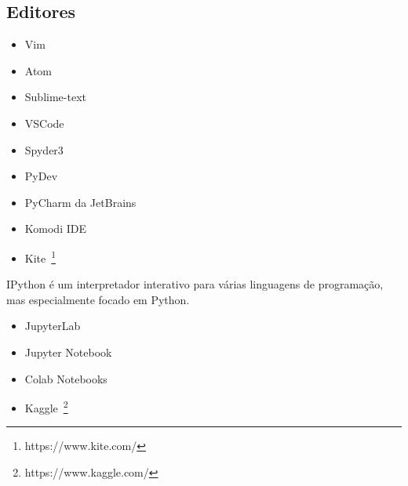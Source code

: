 \subsection*{Editores}

\begin{itemize}
    \item Vim
    \item Atom
    \item Sublime-text
    \item VSCode
    \item Spyder3
    \item PyDev
    \item PyCharm da JetBrains
    \item Komodi IDE
    \item Kite~\footnote{https://www.kite.com/}
\end{itemize}


IPython é um interpretador interativo para várias linguagens de programação, mas especialmente focado em Python.

\begin{itemize}
	\item JupyterLab
	\item Jupyter Notebook
	\item Colab Notebooks
	\item Kaggle~\footnote{https://www.kaggle.com/}
\end{itemize}
